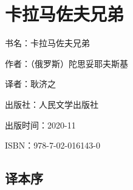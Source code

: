 

\section{卡拉马佐夫兄弟}


\par 书名：卡拉马佐夫兄弟
\par 作者：（俄罗斯）陀思妥耶夫斯基
\par 译者：耿济之
\par 出版社：人民文学出版社
\par 出版时间：2020-11
\par ISBN：978-7-02-016143-0




\subsection*{译本序}

